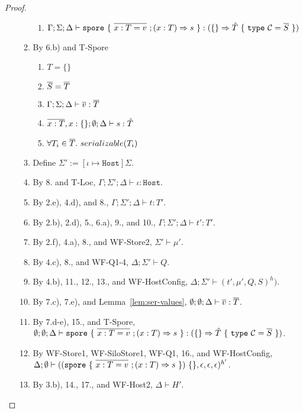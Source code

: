 \begin{proof}
\begin{itemize}
\begin{enumerate}
\begin{enumerate}[label=(\alph*)]
  \item $\Gamma ; \Sigma ; \Delta \vdash \texttt{spore}~\{~\overline{x : T = v}~; (x: T) \Rightarrow s~\} : (\{\} \Rightarrow \hat{T}~\{~\texttt{type}~\mathcal{C} = \overline{S}~\})$
  \end{enumerate}
\item By 6.b) and T-Spore
  \begin{enumerate}[label=(\alph*)]
  \item $T = \{\}$
  \item $\overline{S} = \overline{T}$
  \item $\Gamma ; \Sigma ; \Delta \vdash \overline{v} : \overline{T}$
  \item $\overline{x : T} , x : \{\} ; \emptyset ; \Delta \vdash s : \hat{T}$
  \item $\forall T_i \in \overline{T}.~serializable(T_i)$
  \end{enumerate}
\item Define $\Sigma' := [\iota \mapsto \texttt{Host}]\Sigma$.
\item By 8. and T-Loc, $\Gamma ; \Sigma' ; \Delta \vdash \iota : \texttt{Host}$.
\item By 2.e), 4.d), and 8., $\Gamma ; \Sigma' ; \Delta \vdash t : T'$.
\item By 2.b), 2.d), 5., 6.a), 9., and 10., $\Gamma ; \Sigma' ; \Delta \vdash t' : T'$.
\item By 2.f), 4.a), 8., and WF-Store2, $\Sigma' \vdash \mu'$.
\item By 4.c), 8., and WF-Q1-4, $\Delta ; \Sigma' \vdash Q$.
\item By 4.b), 11., 12., 13., and WF-HostConfig, $\Delta ; \Sigma' \vdash (t', \mu', Q, S)^h)$.
\item By 7.c), 7.e), and Lemma~\ref{lem:ser-values}, $\emptyset ; \emptyset ; \Delta \vdash \overline{v} : \overline{T}$.
\item By 7.d-e), 15., and T-Spore, $\emptyset ; \emptyset ; \Delta \vdash \texttt{spore}~\{~\overline{x : T = v}~; (x: T) \Rightarrow s~\} : (\{\} \Rightarrow \hat{T}~\{~\texttt{type}~\mathcal{C} = \overline{S}~\})$.
\item By WF-Store1, WF-SiloStore1, WF-Q1, 16., and WF-HostConfig, $\Delta ; \emptyset \vdash ((\texttt{spore}~\{~\overline{x : T = v}~; (x: T) \Rightarrow s~\})~\{\}, \epsilon, \epsilon, \epsilon)^{h'}$.
\item By 3.b), 14., 17., and WF-Host2, $\Delta \vdash H'$.
\end{enumerate}


\end{itemize}
\end{proof}
